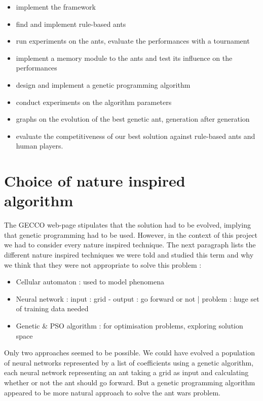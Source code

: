 \documentclass[10pt,a4paper]{article}
\begin{document}
\begin{itemize}
\item implement the framework
\item find and implement rule-based ants
\item run experiments on the ants, evaluate the performances with a tournament
\item implement a memory module to the ants and test its influence on the performances
\item design and implement a genetic programming algorithm
\item conduct experiments on the algorithm parameters
\item graphs on the evolution of the best genetic ant, generation after generation
\item evaluate the competitiveness of our best solution against
  rule-based ants and human players.
\end{itemize}

\section{Choice of nature inspired algorithm}

The GECCO web-page stipulates that the solution had to be evolved,
implying that genetic programming had to be used. However, in the
context of this project we had to consider every nature inspired
technique. The next paragraph lists the different nature inspired
techniques we were told and studied this term and why we think that
they were not appropriate to solve this problem :

\begin{itemize}
\item Cellular automaton : used to model phenomena
\item Neural network : input : grid - output : go forward or not |
  problem : huge set of training data needed
\item Genetic & PSO algorithm : for optimisation problems, exploring solution space
\end{itemize}

Only two approaches seemed to be possible. We could have evolved a
population of neural networks represented by a list of coefficients
using a genetic algorithm, each neural network representing an ant
taking a grid as input and calculating whether or not the ant should
go forward. But a genetic programming algorithm appeared to be more
natural approach to solve the ant wars problem.
\end{document}
